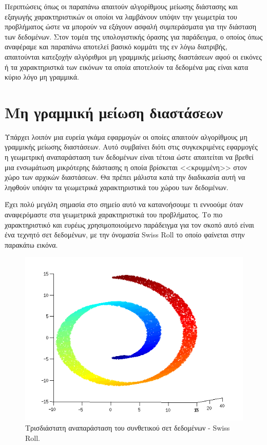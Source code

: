 \par
Περιπτώσεις όπως οι παραπάνω απαιτούν αλγορίθμους μείωσης διάστασης και εξαγωγής χαρακτηριστικών οι οποίοι να λαμβάνουν υπόψιν την γεωμετρία του προβλήματος ώστε να μπορούν να εξάγουν ασφαλή συμπεράσματα για την διάσταση των δεδομένων. Στον τομέα της υπολογιστικής όρασης για παράδειγμα, ο οποίος όπως αναφέραμε και παραπάνω αποτελεί βασικό κομμάτι της εν λόγω διατριβής, απαιτούνται κατεξοχήν αλγόριθμοι μη γραμμικής μείωσης διαστάσεων αφού οι εικόνες ή τα χαρακτηριστκά των εικόνων τα οποία αποτελούν τα δεδομένα μας είναι κατα κύριο λόγο μη γραμμικά. 

\section{Μη γραμμική μείωση διαστάσεων}
\par
Υπάρχει λοιπόν μια ευρεία γκάμα εφαρμογών οι οποίες απαιτούν αλγορίθμους μη γραμμικής μείωσης διαστάσεων. Αυτό συμβαίνει διότι στις συγκεκριμένες εφαρμογές η γεωμετρική αναπαράσταση των δεδομένων είναι τέτοια ώστε απαιτείται να βρεθεί μια ενσωμάτωση μικρότερης διάστασης η οποία βρίσκεται <<κρυμμένη>> στον χώρο των αρχικών διαστάσεων. Θα πρέπει μάλιστα κατά την διαδικασία αυτή να ληφθούν υπόψιν τα γεωμετρικά χαρακτηριστικά του χώρου των δεδομένων. 
\par
Έχει πολύ μεγάλη σημασία στο σημείο αυτό να κατανοήσουμε τι εννοούμε όταν αναφερόμαστε στα γεωμετρικά χαρακτηριστικά του προβλήματος. Το πιο χαρακτηριστικό και ευρέως χρησιμοποιούμενο παράδειγμα για τον σκοπό αυτό είναι ένα τεχνητό σετ δεδομένων, με την όνομασία \textlatin{Swiss Roll}\textlatin{\cite{swiss_roll}} το οποίο φαίνεται στην παρακάτω εικόνα. \\
\vspace{1.0cm}
\begin{figure}[h]
\centering
\includegraphics[scale=0.8]{figs/2.png}
\newline
\caption{ Τρισδιάστατη αναπαράσταση του συνθετικού σετ δεδομένων - \textlatin{Swiss Roll}.} 
\end{figure}
